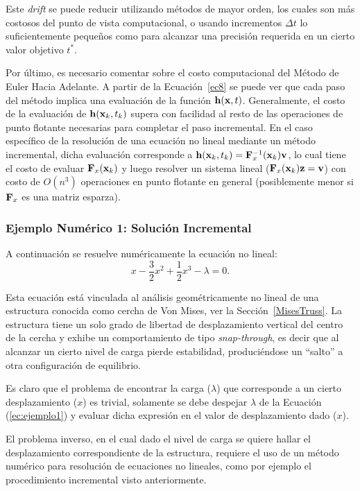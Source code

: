 Este \textit{drift} se puede reducir utilizando métodos de mayor orden, los cuales son más costosos del punto de vista computacional, o usando incrementos $\Delta t$ lo suficientemente pequeños como para alcanzar una precisión requerida en un cierto valor objetivo $t^*$.

Por último, es necesario comentar sobre el costo computacional del Método de Euler Hacia Adelante. %
%
A partir de la Ecuación~\eqref{ec8} se puede ver que cada paso del método implica una evaluación de la función ${\bf h}({\bf x},t)$. %
%
Generalmente, el costo de la evaluación de ${\bf h}({\bf x}_k,t_k)$ supera con facilidad al resto de las operaciones de punto flotante necesarias para completar el paso incremental. %
%
En el caso específico de la resolución de una ecuación no lineal mediante un método incremental, dicha evaluación corresponde a ${\bf h}({\bf x}_k,t_k)={\bf F}_x^{-1}({\bf x}_k){\bf v}$, lo cual tiene el costo de evaluar ${\bf F}_x({\bf x}_k)$ y luego resolver un sistema lineal (${\bf F}_x({\bf x}_k){\bf z}={\bf v}$) con costo de $O(n^3)$ operaciones en punto flotante en general (posiblemente menor si ${\bf F}_x$ es una matriz esparza).

\subsubsection{Ejemplo Numérico 1: Solución Incremental}\label{ej1}

A continuación se resuelve numéricamente la ecuación no lineal:
%
\begin{equation}\label{ec:ejemplo1}
x-\frac{3}{2}x^2+\frac{1}{2}x^3-\lambda=0.
\end{equation}

Esta ecuación está vinculada al análisis geométricamente no lineal de una estructura conocida como cercha de Von Mises, ver la Sección~\ref{MisesTruss}. La estructura tiene un solo grado de libertad de desplazamiento vertical del centro de la cercha y exhibe un comportamiento de tipo \textit{snap-through}, es decir que al alcanzar un cierto nivel de carga pierde estabilidad, produciéndose un ``salto'' a otra configuración de equilibrio.


Es claro que el problema de encontrar la carga ($\lambda$) que corresponde a un cierto desplazamiento ($x$) es trivial, solamente se debe despejar $\lambda$ de la Ecuación (\ref{ec:ejemplo1}) y evaluar dicha expresión en el valor de desplazamiento dado ($x$).

El problema inverso, en el cual dado el nivel de carga se quiere hallar el desplazamiento correspondiente de la estructura, requiere el uso de un método numérico para resolución de ecuaciones no lineales, como por ejemplo el procedimiento incremental visto anteriormente.


